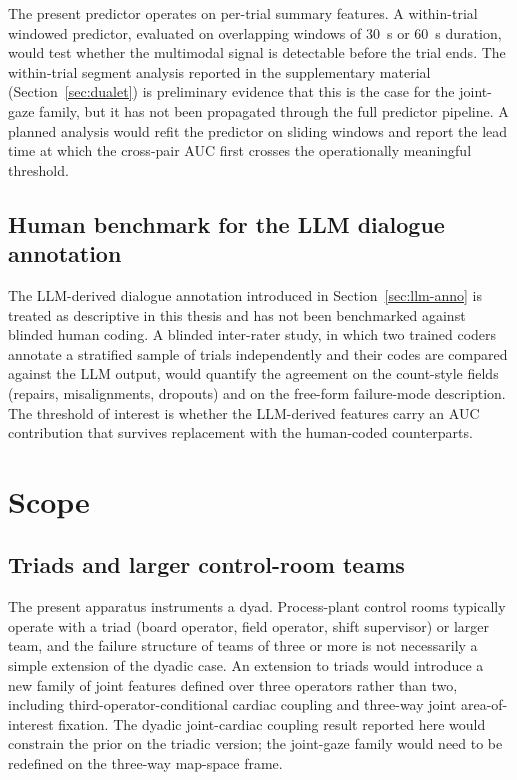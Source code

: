 The present predictor operates on per-trial summary features. A within-trial windowed predictor, evaluated on overlapping windows of $30$~s or $60$~s duration, would test whether the multimodal signal is detectable before the trial ends. The within-trial segment analysis reported in the supplementary material (Section~\ref{sec:dualet}) is preliminary evidence that this is the case for the joint-gaze family, but it has not been propagated through the full predictor pipeline. A planned analysis would refit the predictor on sliding windows and report the lead time at which the cross-pair AUC first crosses the operationally meaningful threshold.

\subsection{Human benchmark for the LLM dialogue annotation}

The LLM-derived dialogue annotation introduced in Section~\ref{sec:llm-anno} is treated as descriptive in this thesis and has not been benchmarked against blinded human coding. A blinded inter-rater study, in which two trained coders annotate a stratified sample of trials independently and their codes are compared against the LLM output, would quantify the agreement on the count-style fields (repairs, misalignments, dropouts) and on the free-form failure-mode description. The threshold of interest is whether the LLM-derived features carry an AUC contribution that survives replacement with the human-coded counterparts.

\section{Scope}

\subsection{Triads and larger control-room teams}

The present apparatus instruments a dyad. Process-plant control rooms typically operate with a triad (board operator, field operator, shift supervisor) or larger team, and the failure structure of teams of three or more is not necessarily a simple extension of the dyadic case. An extension to triads would introduce a new family of joint features defined over three operators rather than two, including third-operator-conditional cardiac coupling and three-way joint area-of-interest fixation. The dyadic joint-cardiac coupling result reported here would constrain the prior on the triadic version; the joint-gaze family would need to be redefined on the three-way map-space frame.

